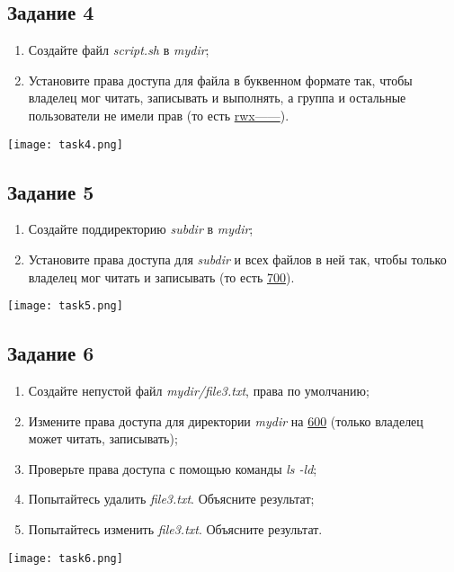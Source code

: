 \documentclass[12pt, a4paper]{report}
\begin{document}
	\subsection*{Задание 4}
	\begin{enumerate}
		\item Создайте файл \textit{script.sh} в \textit{mydir};
		\item Установите права доступа для файла в буквенном формате так, чтобы владелец мог читать, записывать и выполнять, а группа и остальные пользователи не имели прав (то есть \underline{rwx------}).
	\end{enumerate}
	\lstset{style=mystyle}
	
	\begin{center}
		\texttt{[image: task4.png]}
	\end{center}

	\subsection*{Задание 5}
	\begin{enumerate}
		\item Создайте поддиректорию \textit{subdir} в \textit{mydir};
		\item Установите права доступа для \textit{subdir} и всех файлов в ней так, чтобы только владелец мог читать и записывать (то есть \underline{700}).
	\end{enumerate}
	\lstset{style=mystyle}
	
	\begin{center}
		\texttt{[image: task5.png]}
	\end{center}

	\subsection*{Задание 6}
	\begin{enumerate}
		\item Создайте непустой файл \textit{mydir/file3.txt}, права по умолчанию;
		\item Измените права доступа для директории \textit{mydir} на \underline{600} (только владелец может читать, записывать);
		\item Проверьте права доступа с помощью команды \textit{ls -ld};
		\item Попытайтесь удалить \textit{file3.txt}. Объясните результат;
		\item Попытайтесь изменить \textit{file3.txt}. Объясните результат.
	\end{enumerate}
	\lstset{style=mystyle}
	
	\begin{center}
		\texttt{[image: task6.png]}
	\end{center}
\end{document}
